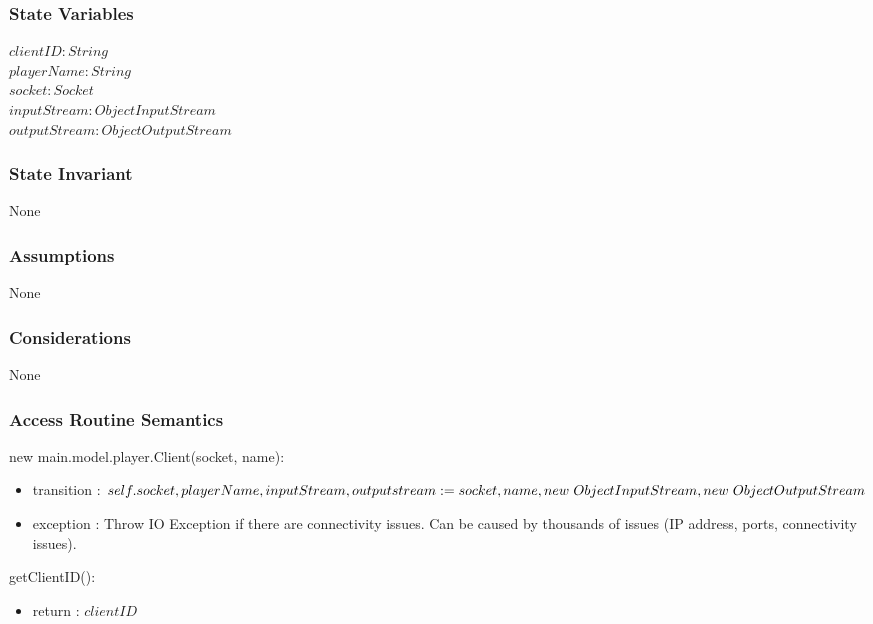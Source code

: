 \documentclass[12pt, titlepage]{article}
\begin{document}
    \subsubsection* {State Variables}
        $\mathit{clientID}: String$\\
        $\mathit{playerName}: String$\\
        $\mathit{socket} : Socket$\\
        $\mathit{inputStream}: ObjectInputStream$\\
        $\mathit{outputStream} : ObjectOutputStream$\\

    \subsubsection* {State Invariant}
        None
    
    \subsubsection* {Assumptions}
        None
    
    \subsubsection* {Considerations}
        None
    
    \subsubsection* {Access Routine Semantics}
    
        \noindent new main.model.player.Client(socket, name):
        \begin{itemize}
        \item transition : $self.socket, playerName, inputStream, outputstream := \\ socket, name, new \hspace{3px} ObjectInputStream, new \hspace{3px} ObjectOutputStream$
        \item exception : Throw IO Exception if there are connectivity issues. Can be caused by thousands of issues (IP address, ports, connectivity issues).
        \end{itemize}
        
        \noindent getClientID():
        \begin{itemize}
        \item return : $clientID$
        \end{itemize}
        
\end{document}
